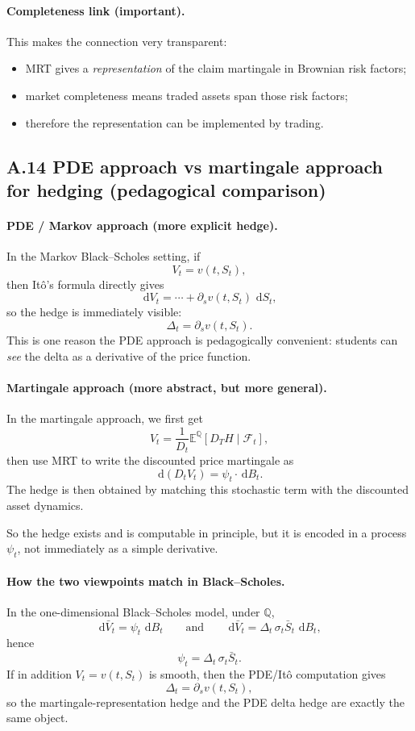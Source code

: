 \documentclass[11pt]{article}
\newcommand{\Qbb}{\mathbb{Q}}
\newcommand{\E}{\mathbb{E}}
\newcommand{\dd}{\,\mathrm{d}}
\newcommand{\1}{\mathbf{1}}
\begin{document}
\paragraph{Completeness link (important).}
This makes the connection very transparent:
\begin{itemize}[leftmargin=1.4em]
    \item MRT gives a \emph{representation} of the claim martingale in Brownian risk factors;
    \item market completeness means traded assets span those risk factors;
    \item therefore the representation can be implemented by trading.
\end{itemize}

\subsection*{A.14 PDE approach vs martingale approach for hedging (pedagogical comparison)}

\paragraph{PDE / Markov approach (more explicit hedge).}
In the Markov Black--Scholes setting, if
$$
V_t=v(t,S_t),
$$
then It\^o's formula directly gives
$$
\dd V_t = \cdots + \partial_s v(t,S_t)\,\dd S_t,
$$
so the hedge is immediately visible:
$$
\boxed{\ \Delta_t=\partial_s v(t,S_t). \ }
$$
This is one reason the PDE approach is pedagogically convenient: students can \emph{see} the delta as a derivative of the price function.

\paragraph{Martingale approach (more abstract, but more general).}
In the martingale approach, we first get
$$
V_t=\frac{1}{D_t}\E^{\Qbb}[D_T H\mid \mathcal F_t],
$$
then use MRT to write the discounted price martingale as
$$
\dd(D_tV_t)=\psi_t\cdot \dd B_t.
$$
The hedge is then obtained by matching this stochastic term with the discounted asset dynamics.

So the hedge exists and is computable in principle, but it is encoded in a process \(\psi_t\), not immediately as a simple derivative.

\paragraph{How the two viewpoints match in Black--Scholes.}
In the one-dimensional Black--Scholes model, under \(\Qbb\),
$$
\dd \bar V_t=\psi_t\,\dd B_t
\qquad\text{and}\qquad
\dd \bar V_t=\Delta_t\,\sigma_t \bar S_t\,\dd B_t,
$$
hence
$$
\psi_t=\Delta_t\,\sigma_t \bar S_t.
$$
If in addition \(V_t=v(t,S_t)\) is smooth, then the PDE/It\^o computation gives
$$
\Delta_t=\partial_s v(t,S_t),
$$
so the martingale-representation hedge and the PDE delta hedge are exactly the same object.
\end{document}
